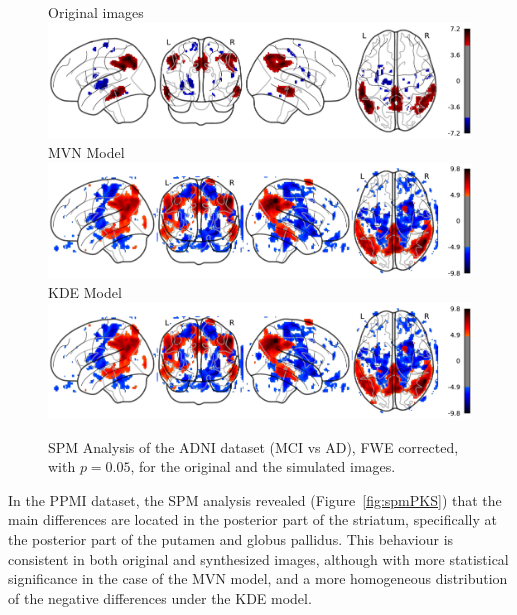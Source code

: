 \begin{figure}
	\centering
	Original \adnipet{} images\\
	\includegraphics[width=\linewidth]{Graphics/ch8/MCIvsAD_Orig_glass}\\
	\ac{MVN} Model\\
	\includegraphics[width=\linewidth]{Graphics/ch8/MCIvsAD_MVN_glass}\\
	\ac{KDE} Model\\
	\includegraphics[width=\linewidth]{Graphics/ch8/MCIvsAD_KDE_glass}
	\caption[\acs{SPM} Analysis of the \acs{ADNI} dataset (\acs{MCI} vs \acs{AD}).]{\ac{SPM} Analysis of the \acs{ADNI} dataset (\ac{MCI} vs \ac{AD}), \ac{FWE} corrected, with $p=0.05$, for the original and the simulated images.}
	\label{fig:spmMCIvsAD}
\end{figure}

In the \ac{PPMI} dataset, the \ac{SPM} analysis revealed (Figure~\ref{fig:spmPKS}) that the main differences are located in the posterior part of the striatum, specifically at the posterior part of the putamen and globus pallidus. This behaviour is consistent in both original and synthesized images, although with more statistical significance in the case of the \ac{MVN} model, and a more homogeneous distribution of the negative differences under the \ac{KDE} model. 


